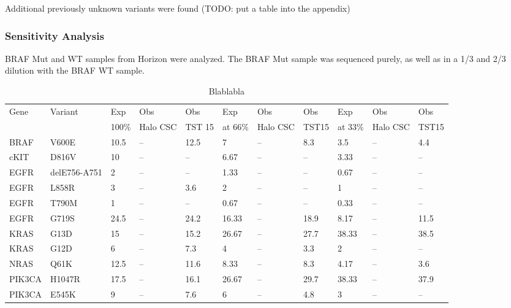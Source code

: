 Additional previously unknown variants were found (TODO: put a table into the appendix)

\subsubsection{Sensitivity Analysis}
BRAF Mut and WT samples from Horizon were analyzed. The BRAF Mut sample was
sequenced purely, as well as in a 1/3 and 2/3 dilution with the BRAF WT sample.

\begin{table}
  \caption[sensitivity_analysis]{Blablabla}
  \centering
    \begin{tabular}{| p{1.2cm} | p{1.5cm} | p{1cm}| p{1cm}| p{1cm}| p{1cm}| p{1cm}| p{1cm}| p{1cm}| p{1cm}| p{1cm} |}
    \hline
    Gene & Variant & Exp &  Obs &  Obs & Exp &  Obs & Obs & Exp & Obs & Obs \\
         &         & 100\% &  Halo CSC &  TST 15   & at 66\%  &  Halo CSC & TST15    & at 33\%  & Halo CSC & TST15 \\
    \hline \hline
    BRAF & V600E        & 10.5  & -- & 12.5 & 7     & -- & 8.3  & 3.5   & -- & 4.4 \\
    cKIT & D816V        & 10    & -- & --   & 6.67  & -- & --   & 3.33  & -- & -- \\
    EGFR & delE756-A751 & 2     & -- & --   & 1.33  & -- & --   & 0.67  & -- & -- \\
    EGFR & L858R        & 3     & -- & 3.6  & 2     & -- & --   & 1     & -- & -- \\
    EGFR & T790M        & 1     & -- & --   & 0.67  & -- & --   & 0.33  & -- & -- \\
    EGFR & G719S        & 24.5  & -- & 24.2 & 16.33 & -- & 18.9 & 8.17  & -- & 11.5 \\
    KRAS & G13D         & 15    & -- & 15.2 & 26.67 & -- & 27.7 & 38.33 & -- & 38.5 \\
    KRAS & G12D         & 6     & -- & 7.3  & 4     & -- & 3.3  & 2     & -- & -- \\
    NRAS & Q61K         & 12.5  & -- & 11.6 & 8.33  & -- & 8.3  & 4.17  & -- & 3.6 \\
    PIK3CA & H1047R     & 17.5  & -- & 16.1 & 26.67 & -- & 29.7 & 38.33 & -- & 37.9 \\
    PIK3CA & E545K      & 9     & -- & 7.6  & 6     & -- & 4.8  & 3     & -- & -- \\
    \hline
    \end{tabular}
\end{table}

